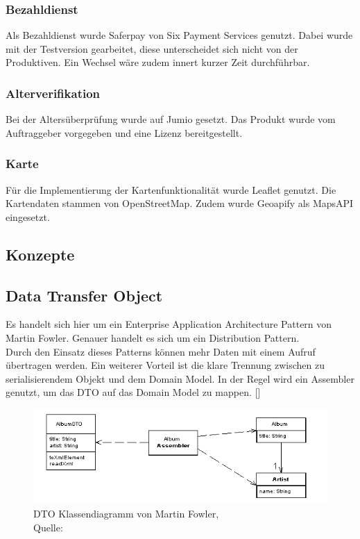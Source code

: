 \subsubsection{Bezahldienst}
Als Bezahldienst wurde Saferpay von Six Payment Services genutzt. Dabei wurde mit der Testversion gearbeitet, diese unterscheidet sich nicht von der Produktiven. Ein Wechsel wäre zudem innert kurzer Zeit durchführbar. 

\subsubsection{Alterverifikation}
Bei der Altersüberprüfung wurde auf Jumio gesetzt. Das Produkt wurde vom Auftraggeber vorgegeben und eine Lizenz bereitgestellt. 

\subsubsection{Karte}
Für die Implementierung der Kartenfunktionalität wurde Leaflet genutzt. Die Kartendaten stammen von OpenStreetMap. Zudem wurde Geoapify als MapsAPI eingesetzt. 

\subsection{Konzepte}
\subsection{Data Transfer Object}\label{DTO}
Es handelt sich hier um ein Enterprise Application Architecture Pattern von Martin Fowler. Genauer handelt es sich um ein Distribution Pattern. \\
Durch den Einsatz dieses Patterns können mehr Daten mit einem Aufruf übertragen werden. Ein weiterer Vorteil ist die klare Trennung zwischen zu serialisierendem Objekt und dem Domain Model. In der Regel wird ein Assembler genutzt, um das DTO auf das Domain Model zu mappen. [\cite{dtoFowler}]

\begin{figure}[H]
	\centering
	\includegraphics[width=1\textwidth]{images/dtoSketch.png}
	\caption[DTO Klassendiagramm von Martin Fowler]{DTO Klassendiagramm von Martin Fowler,\\ Quelle: \cite{dtoFowler}}
	\label{img: dtoFowler}
\end{figure}

